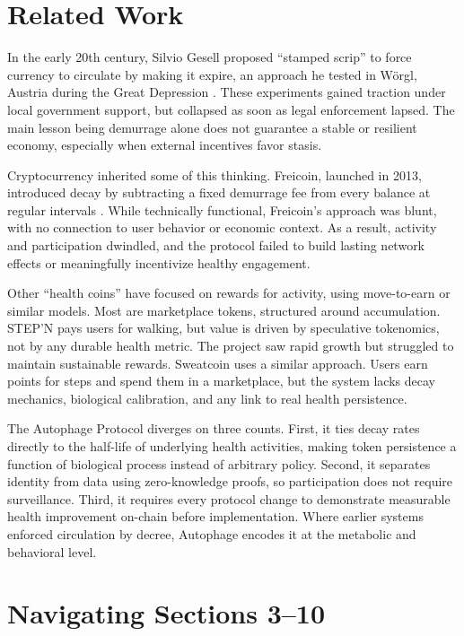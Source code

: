 \documentclass[11pt,letterpaper]{article}
\begin{document}
\section{Related Work}
In the early 20th century, Silvio Gesell proposed ``stamped scrip'' to force currency to circulate by making it expire, an approach he tested in Wörgl, Austria during the Great Depression \cite{gesell1958natural}. These experiments gained traction under local government support, but collapsed as soon as legal enforcement lapsed. The main lesson being demurrage alone does not guarantee a stable or resilient economy, especially when external incentives favor stasis.

Cryptocurrency inherited some of this thinking. Freicoin, launched in 2013, introduced decay by subtracting a fixed demurrage fee from every balance at regular intervals \cite{freicoin2013project}. While technically functional, Freicoin's approach was blunt, with no connection to user behavior or economic context. As a result, activity and participation dwindled, and the protocol failed to build lasting network effects or meaningfully incentivize healthy engagement.

Other ``health coins'' have focused on rewards for activity, using move-to-earn or similar models. Most are marketplace tokens, structured around accumulation. STEP'N \cite{stepn2022whitepaper} pays users for walking, but value is driven by speculative tokenomics, not by any durable health metric. The project saw rapid growth but struggled to maintain sustainable rewards. Sweatcoin uses a similar approach. Users earn points for steps and spend them in a marketplace, but the system lacks decay mechanics, biological calibration, and any link to real health persistence.

\clearpage

The Autophage Protocol diverges on three counts. First, it ties decay rates directly to the half-life of underlying health activities, making token persistence a function of biological process instead of arbitrary policy. Second, it separates identity from data using zero-knowledge proofs, so participation does not require surveillance. Third, it requires every protocol change to demonstrate measurable health improvement on-chain before implementation. Where earlier systems enforced circulation by decree, Autophage encodes it at the metabolic and behavioral level.

\section*{Navigating Sections 3–10}
\end{document}
